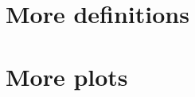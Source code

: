 \setcounter{page}{1}
\chapter{More definitions}
\clearpage
\setcounter{page}{1}
\chapter{More plots}